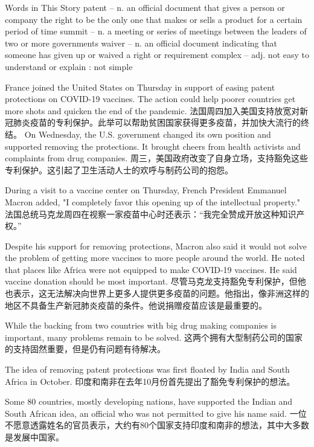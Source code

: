 \begin{messagebox}
Words in This Story
patent – n. an official document that gives a person or company the right to be the only one that makes or sells a product for a certain period of time
summit – n. a meeting or series of meetings between the leaders of two or more governments
waiver – n. an official document indicating that someone has given up or waived a right or requirement
complex – adj. not easy to understand or explain : not simple
\end{messagebox}

France joined the United States on Thursday in support of easing patent protections on COVID-19 vaccines. The action could help poorer countries get more shots and quicken the end of the pandemic.
法国周四加入美国支持放宽对新冠肺炎疫苗的专利保护。此举可以帮助贫困国家获得更多疫苗，并加快大流行的终结。
On Wednesday, the U.S. government changed its own position and supported removing the protections. It brought cheers from health activists and complaints from drug companies.
周三，美国政府改变了自身立场，支持豁免这些专利保护。这引起了卫生活动人士的欢呼与制药公司的抱怨。

During a visit to a vaccine center on Thursday, French President Emmanuel Macron added, "I completely favor this opening up of the intellectual property."
法国总统马克龙周四在视察一家疫苗中心时还表示：“我完全赞成开放这种知识产权。”

Despite his support for removing protections, Macron also said it would not solve the problem of getting more vaccines to more people around the world. He noted that places like Africa were not equipped to make COVID-19 vaccines. He said vaccine donation should be most important.
尽管马克龙支持豁免专利保护，但他也表示，这无法解决向世界上更多人提供更多疫苗的问题。他指出，像非洲这样的地区不具备生产新冠肺炎疫苗的条件。他说捐赠疫苗应该是最重要的。

While the backing from two countries with big drug making companies is important, many problems remain to be solved.
这两个拥有大型制药公司的国家的支持固然重要，但是仍有问题有待解决。

The idea of removing patent protections was first floated by India and South Africa in October.
印度和南非在去年10月份首先提出了豁免专利保护的想法。

Some 80 countries, mostly developing nations, have supported the Indian and South African idea, an official who was not permitted to give his name said.
一位不愿意透露姓名的官员表示，大约有80个国家支持印度和南非的想法，其中大多数是发展中国家。

